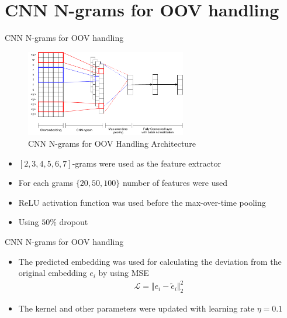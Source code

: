 \documentclass{beamer}
\begin{document}

\section{CNN N-grams for OOV handling}
\begin{frame}{CNN N-grams for OOV handling}
    \begin{figure}[H]
        \centering
        \includegraphics[width=70mm]{images/model_batchnorm}
        \caption{CNN N-grams for OOV Handling Architecture}
    \end{figure}
    \begin{itemize}
        \item $[2, 3, 4, 5, 6, 7]$-grams were used as the feature extractor
        \item For each grams $\{20, 50, 100\}$ number of features were used
        \item ReLU activation function was used before the
        max-over-time pooling
        \item Using $50\%$ dropout
    \end{itemize}
\end{frame}


\begin{frame}{CNN N-grams for OOV handling}
    \begin{itemize}
        \item The predicted embedding was used for calculating the
        deviation from the original embedding $e_i$ by using MSE
        \begin{align*}
            \mathcal{L} = \Vert e_i - \tilde{e}_i \Vert^2_2
        \end{align*}
        \item The kernel and other parameters were updated with
        learning rate $\eta = 0.1$
    \end{itemize}
\end{frame}

\end{document}

